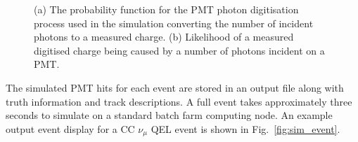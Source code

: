 \begin{figure} %
    \centering
    \quad
    \caption[Detector simulation PMT digitisation function]
    {(a) The probability function for the PMT photon digitisation process used in the simulation
        converting the number of incident photons to a measured charge. (b) Likelihood of a
        measured digitised charge being caused by a number of photons incident on a PMT.}
    \label{fig:digitisation}
\end{figure}

The simulated PMT hits for each event are stored in an output file along with truth information
and track descriptions. A full event takes approximately three seconds to simulate on a standard
batch farm computing node. An example output event display for a CC $\nu_{\mu}$ QEL event is shown
in Fig.~\ref{fig:sim_event}.


